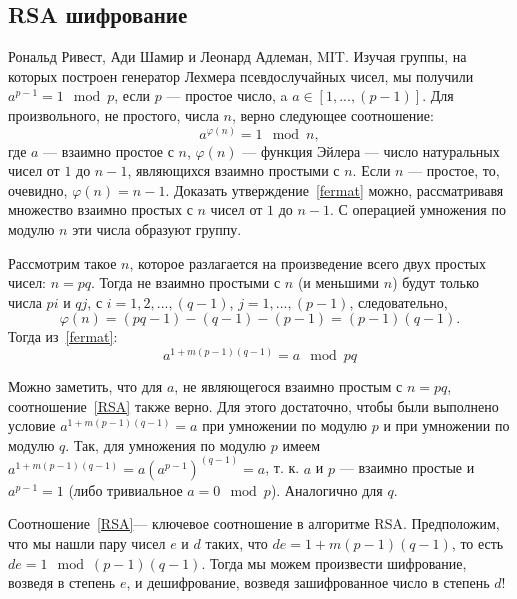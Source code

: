 \documentclass{book}
\begin{document}
\subsection{RSA шифрование}

Рональд Ривест, Ади Шамир и Леонард Адлеман, MIT. Изучая группы, на которых построен генератор
Лехмера псевдослучайных чисел, мы получили $a^{p - 1} = 1 \mod p$, если $p$ --- простое число, a $a
\in [1, ..., (p-1)]$. Для произвольного, не простого, числа $n$, верно следующее соотношение:
\begin{equation}
    \label{fermat}
    a^{\varphi(n)} = 1 \mod n,
\end{equation}
где $a$ --- взаимно простое с $n$, $\varphi(n)$ --- функция Эйлера --- число натуральных чисел от $1$ до $n - 1$, являющихся
взаимно простыми с $n$. Если $n$ --- простое, то, очевидно, $\varphi(n) = n - 1$. Доказать
утверждение~\ref{fermat} можно, рассматривавя множество взаимно простых с $n$ чисел от $1$ до $n -
1$. С операцией умножения по модулю $n$ эти числа образуют группу.

Рассмотрим такое $n$, которое разлагается на произведение всего двух простых чисел: $n = pq$. Тогда
не взаимно простыми с $n$ (и меньшими $n$) будут только числа $pi$ и $q j$, с $i = 1, 2, ..., (q -
1)$, $j = 1,..., (p  - 1)$, следовательно,
\begin{equation}
    \varphi(n) = (p q - 1) - (q - 1) - (p - 1) = (p - 1)(q - 1).
\end{equation}
Тогда из~\ref{fermat}:
\begin{equation}
    \label{RSA}
    a^{1 + m (p - 1) (q - 1)} = a \mod pq
\end{equation}

Можно заметить, что для $a$, не являющегося взаимно простым с $n = pq$, соотношение~\ref{RSA} также
верно. Для этого достаточно, чтобы были выполнено условие $a^{1 + m (p - 1) (q - 1)} = a$ при
умножении по модулю $p$ и при умножении по модулю $q$. Так, для умножения по модулю $p$ имеем $a^{1
+ m (p - 1) (q - 1)} = a (a^{p - 1})^{(q - 1)} = a$, т. к. $a$ и $p$ --- взаимно простые и $a^{p -
1} = 1$ (либо тривиальное $a = 0 \mod p$). Аналогично для $q$. 

Соотношение~\ref{RSA}--- ключевое соотношение в алгоритме RSA.
Предположим, что мы нашли пару чисел $e$ и $d$ таких, что
$de = 1 + m (p - 1) (q - 1)$, то есть $de = 1 \mod (p - 1) (q - 1)$. Тогда мы можем произвести
шифрование, возведя в степень $e$, и дешифрование, возведя зашифрованное число в степень $d$!
\end{document}

